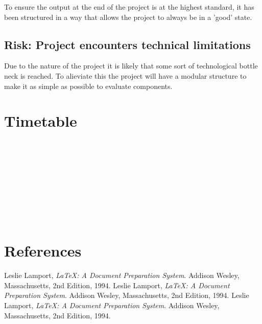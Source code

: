 \documentclass[a4paper,12pt,notitlepage]{article}
\begin{document}
To ensure the output at the end of the project is at the highest standard, it has
been structured in a way that allows the project to always be in a 'good' state.

\subsection*{Risk: Project encounters technical limitations}
Due to the nature of the project it is likely that some sort of technological 
bottle neck is reached. To alieviate this the project will have a modular 
structure to make it as simple as possible to evaluate components.

\section{Timetable}

\begin{ganttchart}[vgrid, hgrid, time slot modifier=0,x unit=0.8cm]{15}
	 \\
	
	 \\

	 \\
	 \\
	 \\
	 \\
	 \\
	 \\
\end{ganttchart}


\section{References}
\begin{thebibliography}{9}


  Leslie Lamport,
  \emph{\LaTeX: A Document Preparation System}.
  Addison Wesley, Massachusetts,
  2nd Edition,
  1994.
  Leslie Lamport,
  \emph{\LaTeX: A Document Preparation System}.
  Addison Wesley, Massachusetts,
  2nd Edition,
  1994.
  Leslie Lamport,
  \emph{\LaTeX: A Document Preparation System}.
  Addison Wesley, Massachusetts,
  2nd Edition,
  1994.
\end{thebibliography}
\end{document}
